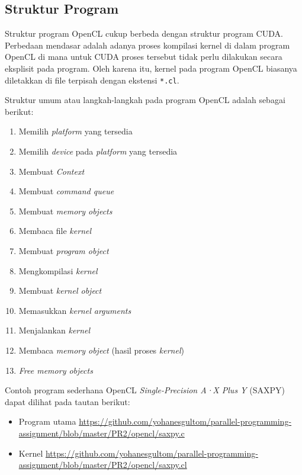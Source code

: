 \subsection{Struktur Program}

Struktur program OpenCL cukup berbeda dengan struktur program CUDA. Perbedaan mendasar adalah adanya proses kompilasi kernel di dalam program OpenCL di mana untuk CUDA proses tersebut tidak perlu dilakukan secara eksplisit pada program. Oleh karena itu, kernel pada program OpenCL biasanya diletakkan di file terpisah dengan ekstensi \verb|*.cl|.

Struktur umum atau langkah-langkah pada program OpenCL adalah sebagai berikut:

\begin{enumerate}
		\item Memilih \textit{platform} yang tersedia
		\item Memilih \textit{device} pada \textit{platform} yang tersedia
		\item Membuat \textit{Context} ​
		\item Membuat \textit{command queue}
		\item Membuat \textit{memory objects} ​
		\item Membaca file \textit{kernel}
		\item Membuat \textit{program object}
		\item Mengkompilasi \textit{kernel}
		\item Membuat \textit{kernel object}
		\item Memasukkan \textit{kernel arguments}
		\item Menjalankan \textit{kernel}
		\item Membaca \textit{memory object} (hasil proses \textit{kernel})
		\item \textit{Free memory objects}
\end{enumerate}

Contoh program sederhana OpenCL \textit{Single-Precision A·X Plus Y} (SAXPY) dapat dilihat pada tautan berikut:

\begin{itemize}
	\item Program utama \url{https://github.com/yohanesgultom/parallel-programming-assignment/blob/master/PR2/opencl/saxpy.c}
	\item Kernel \url{https://github.com/yohanesgultom/parallel-programming-assignment/blob/master/PR2/opencl/saxpy.cl}
\end{itemize}

